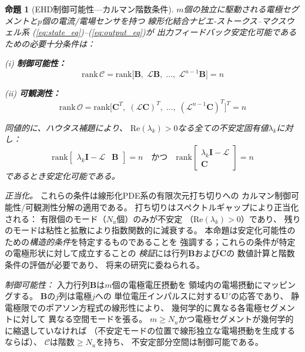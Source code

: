 \documentclass[12pt,twocolumn]{ltjsarticle}
\newtheorem{theorem}{命題}
\newcommand{\uu}{\mathbf{U}}
\newcommand{\Lop}{\mathcal{L}}
\begin{document}
\begin{theorem}[EHD制御可能性---カルマン階数条件]
\label{thm:controllability}
$m$個の独立に駆動される電極セグメントと$p$個の電流/電場センサを持つ
線形化結合ナビエ-ストークス--マクスウェル系
\textnormal{(\ref{eq:state_eq})--(\ref{eq:output_eq})}が
出力フィードバック安定化可能であるための必要十分条件は：

\noindent\textnormal{(i)} \textbf{制御可能性：}
\begin{equation}
  \mathrm{rank}\,\mathcal{C}
  = \mathrm{rank}\bigl[\mathbf{B},\; \Lop\mathbf{B},\;
    \ldots,\; \Lop^{n-1}\mathbf{B}\bigr] = n
  \label{eq:controllability_rank}
\end{equation}

\noindent\textnormal{(ii)} \textbf{可観測性：}
\begin{equation}
  \mathrm{rank}\,\mathcal{O}
  = \mathrm{rank}\bigl[\mathbf{C}^T,\;
    (\Lop\mathbf{C})^T,\; \ldots,\;
    (\Lop^{n-1}\mathbf{C})^T\bigr]^T = n
  \label{eq:observability_rank}
\end{equation}

\noindent
同値的に、ハウタス補題により、
$\mathrm{Re}(\lambda_k) > 0$なる全ての不安定固有値$\lambda_k$に対し：
\begin{equation}
  \mathrm{rank}\begin{bmatrix}
    \lambda_k \mathbf{I} - \Lop & \mathbf{B}
  \end{bmatrix} = n
  \quad \text{かつ} \quad
  \mathrm{rank}\begin{bmatrix}
    \lambda_k \mathbf{I} - \Lop \\ \mathbf{C}
  \end{bmatrix} = n
  \label{eq:hautus}
\end{equation}
であるとき安定化可能である。
\end{theorem}

\textit{正当化。}
これらの条件は線形化PDE系の有限次元打ち切りへの
カルマン制御可能性/可観測性分解\cite{Kalman1960}の適用である。
打ち切りはスペクトルギャップにより正当化される：
有限個のモード（$N_u$個）のみが不安定
（$\mathrm{Re}(\lambda_k) > 0$）であり、
残りのモードは粘性と拡散により指数関数的に減衰する。
本命題は安定化可能性のための\emph{構造的条件}を特定するものであることを
強調する；これらの条件が特定の電極形状に対して成立することの
\emph{検証}には行列$\mathbf{B}$および$\mathbf{C}$の
数値計算と階数条件の評価が必要であり、
将来の研究に委ねられる。

\textit{制御可能性：}
入力行列$\mathbf{B}$は$m$個の電極電圧摂動を
領域内の電場摂動にマッピングする。
$\mathbf{B}$の$j$列は電極$j$への
単位電圧インパルスに対する$\uu'$の応答であり、
静電極限でのポアソン方程式の線形性により、
幾何学的に異なる各電極セグメントに対して
異なる空間モードを張る。
$m \geq N_u$かつ電極セグメントが幾何学的に縮退していなければ
（不安定モードの位置で線形独立な電場摂動を生成するならば）、
$\mathcal{C}$は階数$\geq N_u$を持ち、
不安定部分空間は制御可能である。
\end{document}
